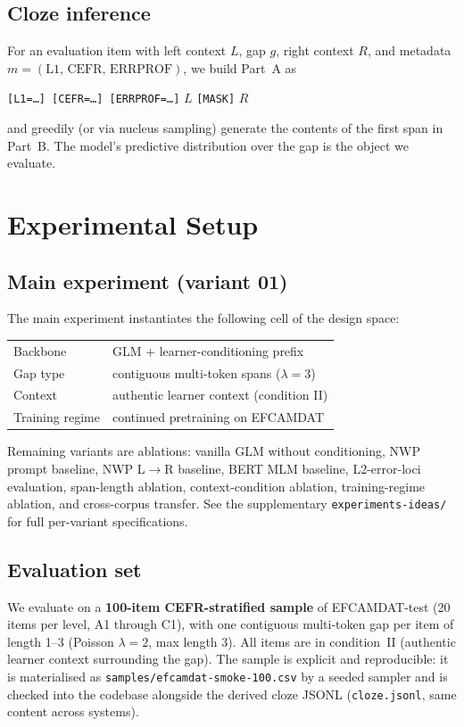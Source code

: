 \documentclass[11pt]{article}
\begin{document}
\subsection{Cloze inference}
For an evaluation item with left context $L$, gap $g$, right context $R$,
and metadata $m = (\text{L1, CEFR, ERRPROF})$, we build Part~A as
\begin{center}\small
\texttt{[L1=\ldots] [CEFR=\ldots] [ERRPROF=\ldots]} $L$ \texttt{[MASK]} $R$
\end{center}
and greedily (or via nucleus sampling) generate the contents of the first
span in Part~B. The model's predictive distribution over the gap is the
object we evaluate.

\section{Experimental Setup}
\label{sec:setup}

\subsection{Main experiment (variant 01)}
\label{sec:main-variant}

The main experiment instantiates the following cell of the design space:

\begin{center}
\begin{tabular}{@{}ll@{}}
\toprule
Backbone           & GLM + learner-conditioning prefix \\
Gap type           & contiguous multi-token spans ($\lambda{=}3$) \\
Context            & authentic learner context (condition II) \\
Training regime    & continued pretraining on EFCAMDAT \\
\bottomrule
\end{tabular}
\end{center}

Remaining variants are ablations: vanilla GLM without conditioning,
NWP prompt baseline, NWP L$\rightarrow$R baseline, BERT MLM baseline,
L2-error-loci evaluation, span-length ablation, context-condition
ablation, training-regime ablation, and cross-corpus transfer.
See the supplementary \texttt{experiments-ideas/} for full per-variant
specifications.

\subsection{Evaluation set}
\label{sec:eval-set}
We evaluate on a \textbf{100-item CEFR-stratified sample} of EFCAMDAT-test
(20 items per level, A1 through C1), with one contiguous multi-token gap
per item of length 1--3 (Poisson $\lambda{=}2$, max length 3). All items
are in condition~II (authentic learner context surrounding the gap). The
sample is explicit and reproducible: it is materialised as
\texttt{\small samples/efcamdat-smoke-100.csv} by a seeded sampler and is
checked into the codebase alongside the derived cloze JSONL
(\texttt{cloze.jsonl}, same content across systems).
\end{document}
